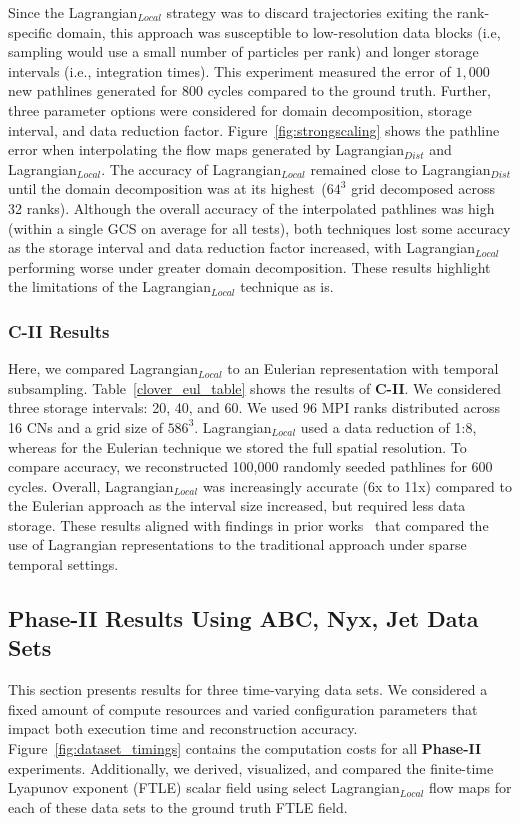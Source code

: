 Since the Lagrangian$_{Local}$ strategy was to discard trajectories exiting the rank-specific domain, this approach was susceptible to low-resolution data blocks (i.e, sampling would use a small number of particles per rank) and longer storage intervals (i.e., integration times).
%
This experiment measured the error of $1,000$ new pathlines generated for 800 cycles compared to the ground truth. 
%
Further, three parameter options were considered for domain decomposition, storage interval, and data reduction factor. 
%
Figure~\ref{fig:strongscaling} shows the pathline error when interpolating the flow maps generated by Lagrangian$_{Dist}$ and Lagrangian$_{Local}$. 
%
The accuracy of Lagrangian$_{Local}$ remained close to Lagrangian$_{Dist}$ until the domain decomposition was at its highest~($64^{3}$ grid decomposed across 32 ranks).
%
%
Although the overall accuracy of the interpolated pathlines was high (within a single GCS on average for all tests), both techniques lost some accuracy as the storage interval and data reduction factor increased, with Lagrangian$_{Local}$ performing worse under greater domain decomposition.
%
These results highlight the limitations of the Lagrangian$_{Local}$ technique as is.
%

\vspace{-2mm}
\subsubsection{C-II Results} 
Here, we compared Lagrangian$_{Local}$ to an Eulerian representation with temporal subsampling.
%
Table~\ref{clover_eul_table} shows the results of \textbf{C-II}.
%
We considered three storage intervals: 20, 40, and 60.
%
We used 96 MPI ranks distributed across 16 CNs and a grid size of $586^3$.
%
Lagrangian$_{Local}$ used a data reduction of 1:8, whereas for the Eulerian technique we stored the full spatial resolution.
%
To compare accuracy, we reconstructed 100,000 randomly seeded pathlines for 600 cycles.
%
%
Overall, Lagrangian$_{Local}$ was increasingly accurate (6x to 11x) compared to the Eulerian approach as the interval size increased, but required less data storage.
%
These results aligned with findings in prior works~\cite{agranovsky2014improved, sane2018revisiting} that compared the use of Lagrangian representations to the traditional approach under sparse temporal settings.


\vspace{-2mm}
\subsection{Phase-II Results Using ABC, Nyx, Jet Data Sets}
This section presents results for three time-varying data sets.
%
We considered a fixed amount of compute resources and varied configuration parameters that impact both execution time and reconstruction accuracy.
%
Figure~\ref{fig:dataset_timings} contains the computation costs for all \textbf{Phase-II} experiments.
%
{Additionally, we derived, visualized, and compared the finite-time Lyapunov exponent (FTLE) scalar field using select Lagrangian$_{Local}$ flow maps for each of these data sets to the ground truth FTLE field.}

\label{sec:experiment2}
\vspace{-2mm}
